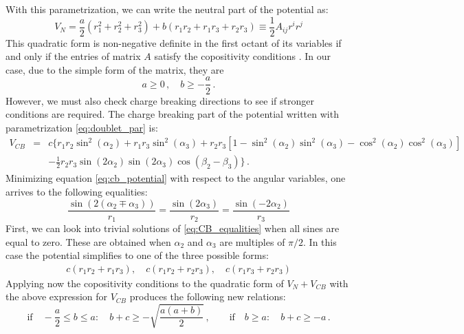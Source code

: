 \documentclass[11pt]{article}
\begin{document}
With this parametrization, we can write the neutral part of the potential as:
\begin{equation}
    V_N = \frac{a}{2}(r_1^2 + r_2^2 + r_3^2) + b(r_1r_2 + r_1r_3 + r_2r_3) \equiv \frac{1}{2}A_{ij}r^i r^j
    \label{eq:VN_par}
\end{equation}
This quadratic form is non-negative definite in the first octant of its variables if and only if the entries of matrix $A$ 
satisfy the copositivity conditions \cite{Kannike:2012pe}. In our case, due to the simple form of the matrix, they are
\begin{equation}
a \geq 0\,,\quad b \geq -\frac{a}{2}\,. \label{eq:st_1}
\end{equation}
However, we must also check charge breaking directions to see if stronger conditions are required. 
The charge breaking part of the potential written with parametrization \eqref{eq:doublet_par} is:
\begin{eqnarray}
   V_{CB} &=& c \big\{ r_1 r_2 \sin^2{(\alpha_2)} + r_1 r_3 \sin^2{(\alpha_3)} + 
    r_2 r_3 \left[1 - \sin^2{(\alpha_2)} \sin^2{(\alpha_3)} - \cos^2{(\alpha_2)}\cos^2{(\alpha_3)}\right] \nonumber\\[2mm] 
    && - \frac{1}{2}r_2 r_3 \sin{(2\alpha_2)}\sin{(2\alpha_3)}\cos{(\beta_2-\beta_3)}\big\}\,.
    \label{eq:cb_potential}
\end{eqnarray}
Minimizing equation \eqref{eq:cb_potential} with respect to the angular variables, one arrives to the following equalities:
\begin{equation}
    \frac{\sin{(2(\alpha_2 \mp \alpha_3))}}{r_1} = \frac{\sin{(2\alpha_3)}}{r_2} = \frac{\sin{(-2\alpha_2)}}{r_3}
    \label{eq:CB_equalities}
\end{equation}
First, we can look into trivial solutions of \eqref{eq:CB_equalities} when all sines are equal to zero.
These are obtained when $\alpha_2$ and $\alpha_3$ are multiples 
of $\pi/2$. In this case the potential simplifies to one of the three possible forms:
\begin{eqnarray}
c(r_1 r_2 + r_1 r_3), \quad c(r_1 r_2 + r_2 r_3), \quad c(r_1 r_3 + r_2 r_3) 
\label{eq:triv_directions}
\end{eqnarray}
Applying now the copositivity conditions to the quadratic form of $V_N + V_{CB}$ with the above expression for $V_{CB}$
produces the following new relations:
\begin{equation}
\textrm{if}\quad -\frac{a}{2}\leq b \leq a:  \quad b + c\geq -\sqrt{\frac{a(a+b)}{2}}\,, \qquad
\textrm{if}\quad b \geq a: \quad b + c\geq -a\,. \label{eq:st_2}
\end{equation}
\end{document}
